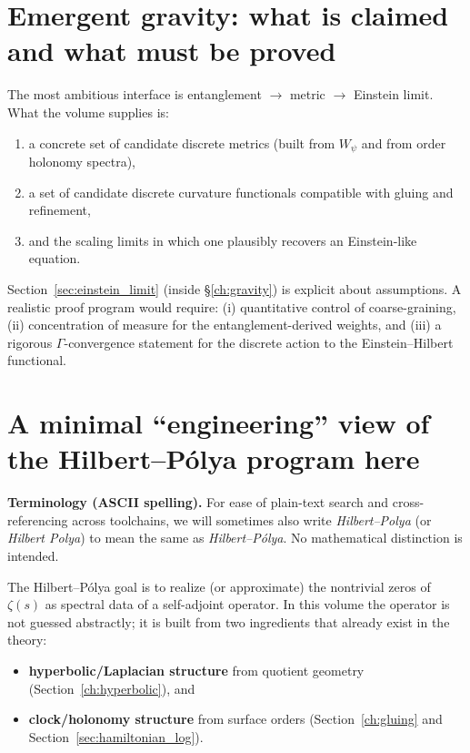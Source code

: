 \documentclass[11pt,oneside]{amsbook}
\numberwithin{equation}{section}
\theoremstyle{plain}
\theoremstyle{definition}
\theoremstyle{remark}
\begin{document}
\section*{Emergent gravity: what is claimed and what must be proved}

The most ambitious interface is entanglement $\to$ metric $\to$ Einstein limit.
What the volume supplies is:
\begin{enumerate}
\item a concrete set of candidate discrete metrics (built from $W_\psi$ and from order holonomy spectra),
\item a set of candidate discrete curvature functionals compatible with gluing and refinement,
\item and the scaling limits in which one plausibly recovers an Einstein-like equation.
\end{enumerate}
Section~\ref{sec:einstein_limit} (inside \S\ref{ch:gravity}) is explicit about assumptions.
A realistic proof program would require: (i) quantitative control of coarse-graining, (ii) concentration of measure for the entanglement-derived weights, and (iii) a rigorous $\Gamma$-convergence statement for the discrete action to the Einstein--Hilbert functional.

\section*{A minimal ``engineering'' view of the Hilbert--Pólya program here}

\noindent\textbf{Terminology (ASCII spelling).}
For ease of plain-text search and cross-referencing across toolchains, we will sometimes also write \emph{Hilbert--Polya} (or \emph{Hilbert Polya}) to mean the same as \emph{Hilbert--P\'olya}.  No mathematical distinction is intended.


The Hilbert--Pólya goal is to realize (or approximate) the nontrivial zeros of $\zeta(s)$ as spectral data of a self-adjoint operator.
In this volume the operator is not guessed abstractly; it is built from two ingredients that already exist in the theory:
\begin{itemize}
\item \textbf{hyperbolic/Laplacian structure} from quotient geometry (Section~\ref{ch:hyperbolic}), and
\item \textbf{clock/holonomy structure} from surface orders (Section~\ref{ch:gluing} and Section~\ref{sec:hamiltonian_log}).
\end{itemize}
\end{document}
